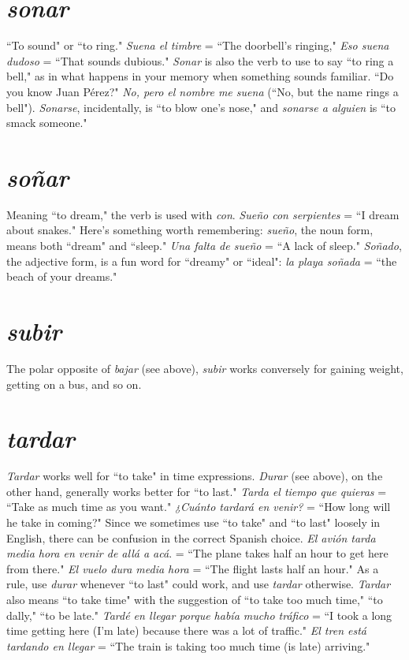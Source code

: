 \section{\emph{sonar}}

``To sound" or ``to ring." \emph{Suena el timbre} = ``The doorbell's
ringing," \emph{Eso suena dudoso} = ``That sounds dubious." \emph{Sonar} is also
the verb to use to say ``to ring a bell," as in what happens in your
memory when something sounds familiar. ``Do you know Juan Pérez?"
\emph{No, pero el nombre me suena} (``No, but the name rings a bell"). \emph{Sonarse}, incidentally, is ``to blow one's nose," and \emph{sonarse a alguien} is
``to smack someone."

\section{\emph{soñar}}

Meaning ``to dream," the verb is used with \emph{con}. \emph{Sueño con serpientes} = ``I dream about snakes." Here's something worth remembering: \emph{sueño}, the noun form, means both ``dream" and ``sleep." \emph{Una
falta de sueño} = ``A lack of sleep." \emph{Soñado}, the adjective form, is a
fun word for ``dreamy" or ``ideal": \emph{la playa soñada} = ``the beach of
your dreams."

\section{\emph{subir}}

The polar opposite of \emph{bajar} (see above), \emph{subir} works conversely
for gaining weight, getting on a bus, and so on.

\section{\emph{tardar}}

\emph{Tardar} works well for ``to take" in time expressions. \emph{Durar}
(see above), on the other hand, generally works better for ``to last."
\emph{Tarda el tiempo que quieras} = ``Take as much time as you want."
\emph{¿Cuánto tardará en venir?} = ``How long will he take in coming?"
Since we sometimes use ``to take" and ``to last" loosely in English,
there can be confusion in the correct Spanish choice. \emph{El avión tarda
media hora en venir de allá a acá}. = ``The plane takes half an hour
to get here from there." \emph{El vuelo dura media hora} = ``The flight lasts
half an hour." As a rule, use \emph{durar} whenever ``to last" could work, and
use \emph{tardar} otherwise. \emph{Tardar} also means ``to take time" with the suggestion of ``to take too much time," ``to dally," ``to be late." \emph{Tardé en
llegar porque había mucho tráfico} = ``I took a long time getting here
(I'm late) because there was a lot of traffic." \emph{El tren está tardando en
llegar} = ``The train is taking too much time (is late) arriving."

